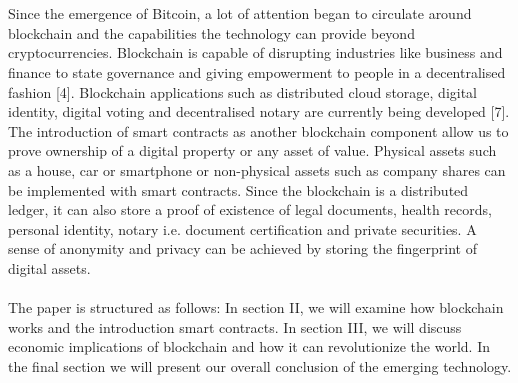 \documentclass[report]{IEEEtran}
\begin{document}
\\\\ Since the emergence of Bitcoin, a lot of attention began to circulate around blockchain and the capabilities the technology can provide beyond cryptocurrencies. Blockchain is capable of disrupting industries like business and finance to state governance and giving empowerment to people in a decentralised fashion [4]. Blockchain applications such as distributed cloud storage, digital identity, digital voting and decentralised notary are currently being developed [7]. The introduction of smart contracts as another blockchain component allow us to prove ownership of a digital property or any asset of value. Physical assets such as a house, car or smartphone or non-physical assets such as company shares can be implemented with smart contracts. Since the blockchain is a distributed ledger, it can also store a proof of existence of legal documents, health records, personal identity, notary i.e. document certification and private securities. A sense of anonymity and privacy can be achieved by storing the fingerprint of digital assets. 
\\\\ The paper is structured as follows: In section II, we will examine how blockchain works and the introduction smart contracts. In section III, we will discuss economic implications of blockchain and how it can revolutionize the world. In the final section we will present our overall conclusion of the emerging technology.
\end{document}
